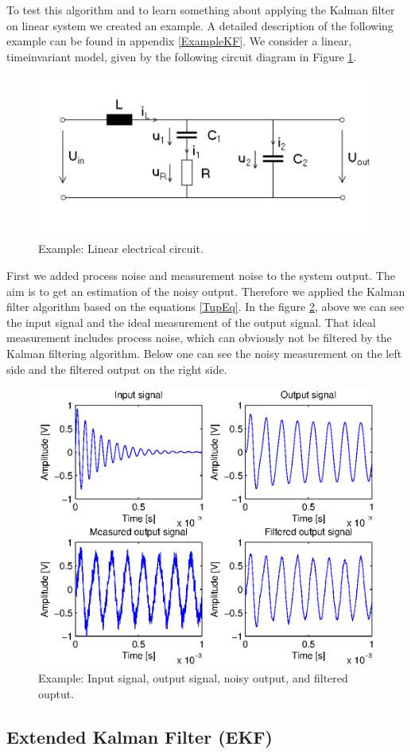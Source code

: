 To test this algorithm and to learn something about applying the Kalman filter on linear system we created an example. A detailed description of the following example can be found in appendix \ref{ExampleKF}. \newline 
We consider a linear, timeinvariant model, given by the following circuit diagram in Figure \ref{KFcircuit}.
\begin{figure}[htbp]
	\centering
    	\includegraphics[width=12cm]{./3_KalmanFilter/circuit_diagram}
  	\caption{Example: Linear electrical circuit.}
  	\label{KFcircuit}
\end{figure}
First we added process noise and measurement noise to the system output. The aim is to get an estimation of the noisy output. Therefore we applied the Kalman filter algorithm based on the equations \ref{TupEq}. In the figure \ref{KFchart}, above we can see the input signal and the ideal measurement of the output signal. That ideal measurement includes process noise, which can obviously not be filtered by the Kalman filtering algorithm. Below one can see the noisy measurement on the left side and the filtered output on the right side.
\begin{figure}[htbp]
	\centering
    	\includegraphics[width=12cm]{./3_KalmanFilter/KFchart}
  	\caption{Example: Input signal, output signal, noisy output, and filtered ouptut.}
  	\label{KFchart}
\end{figure}
\subsection{Extended Kalman Filter (EKF)}

